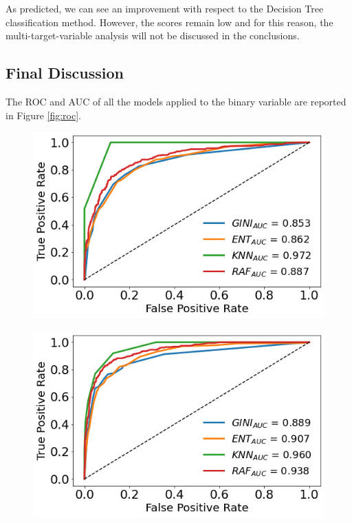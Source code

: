 \documentclass[a4paper,11pt,dvipsnames]{article}
\begin{document}
As predicted, we can see an improvement with respect to the Decision Tree classification method. However, the scores remain low and for this reason, the multi-target-variable analysis will not be discussed in the conclusions.

\subsection{Final Discussion}

The ROC and AUC of all the models applied to the binary variable are reported in Figure \ref{fig:roc}.

\begin{figure}[h]
\centering
\begin{minipage}[b]{.3\linewidth}
\centering\large \includegraphics[width=0.9\linewidth]{arousal_ROC_c.png}
\label{fig:arroc}
\end{minipage}%
    \hfil
\begin{minipage}[b]{.3\linewidth}
\centering\includegraphics[width=0.9\linewidth]{valence_ROC_c.png}\label{fig:valroc}

\end{minipage}
\end{figure}
\end{document}
